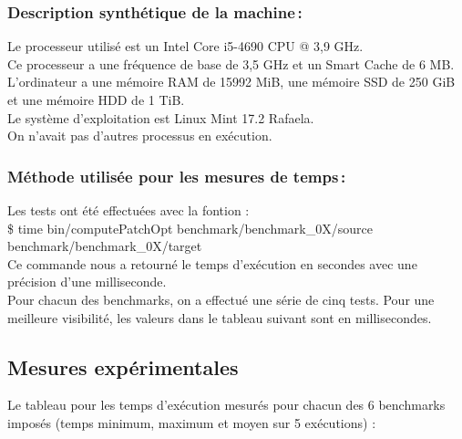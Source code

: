 \documentclass[a4paper, 10pt, french]{article}
\begin{document}
    \subsubsection{Description synthétique de la machine\,:} 
Le processeur utilisé est un Intel Core i5-4690 CPU @ 3,9 GHz.\\
Ce processeur a une fréquence de base de 3,5 GHz et un Smart Cache de 6 MB.\\
L'ordinateur a une mémoire RAM de 15992 MiB, une mémoire SSD de 250 GiB et une mémoire HDD de 1 TiB.\\
Le système d'exploitation est Linux Mint 17.2 Rafaela.\\
On n'avait pas d'autres processus en exécution.

    \subsubsection{Méthode utilisée pour les mesures de temps\,: } 
    Les tests ont été effectuées avec la fontion :
\\
\$ time bin/computePatchOpt benchmark/benchmark\_0X/source benchmark/benchmark\_0X/target 
\\
Ce commande nous a retourné le temps d'exécution en secondes avec une précision d'une milliseconde.\\
Pour chacun des benchmarks, on a effectué une série de cinq tests. Pour une meilleure visibilité, les valeurs dans le tableau suivant sont en millisecondes.

  \subsection{Mesures expérimentales}
    Le tableau pour les temps d'exécution mesurés pour chacun des 6 benchmarks imposés (temps minimum, maximum et moyen sur 5 exécutions) :
\end{document}
